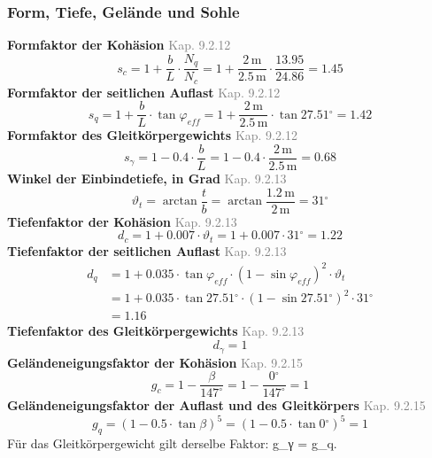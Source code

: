 \documentclass[11pt,a4paper]{article}
\newcommand{\normref}[1]{{\small\textcolor{gray}{#1}}}
\begin{document}
\subsubsection{Form, Tiefe, Gelände und Sohle}
\noindent\textbf{Formfaktor der Kohäsion} \hfill \normref{Kap. 9.2.12}
\begin{equation*}
s_c = 1 + \frac{b}{L} \cdot \frac{N_q}{N_c} = 1 + \frac{2\,\mathrm{m}}{2.5\,\mathrm{m}} \cdot \frac{13.95}{24.86} = 1.45
\end{equation*}
\noindent\textbf{Formfaktor der seitlichen Auflast} \hfill \normref{Kap. 9.2.12}
\begin{equation*}
s_q = 1 + \frac{b}{L} \cdot \tan \varphi_{eff} = 1 + \frac{2\,\mathrm{m}}{2.5\,\mathrm{m}} \cdot \tan 27.51{}^{\circ} = 1.42
\end{equation*}
\noindent\textbf{Formfaktor des Gleitkörpergewichts} \hfill \normref{Kap. 9.2.12}
\begin{equation*}
s_{\gamma} = 1 - 0.4 \cdot \frac{b}{L} = 1 - 0.4 \cdot \frac{2\,\mathrm{m}}{2.5\,\mathrm{m}} = 0.68
\end{equation*}
\noindent\textbf{Winkel der Einbindetiefe, in Grad} \hfill \normref{Kap. 9.2.13}
\begin{equation*}
\vartheta_t = \arctan\frac{t}{b} = \arctan\frac{1.2\,\mathrm{m}}{2\,\mathrm{m}} = 31{}^{\circ}
\end{equation*}
\noindent\textbf{Tiefenfaktor der Kohäsion} \hfill \normref{Kap. 9.2.13}
\begin{equation*}
d_c = 1 + 0.007 \cdot \vartheta_t = 1 + 0.007 \cdot 31{}^{\circ} = 1.22
\end{equation*}
\noindent\textbf{Tiefenfaktor der seitlichen Auflast} \hfill \normref{Kap. 9.2.13}
\begin{equation*}
\begin{aligned}
  d_q &= 1 + 0.035 \cdot \tan \varphi_{eff} \cdot \left(1 - \sin \varphi_{eff}\right)^{2} \cdot \vartheta_t \\
  &= 1 + 0.035 \cdot \tan 27.51{}^{\circ} \cdot \left(1 - \sin 27.51{}^{\circ}\right)^{2} \cdot 31{}^{\circ} \\
  &= 1.16
\end{aligned}
\end{equation*}
\noindent\textbf{Tiefenfaktor des Gleitkörpergewichts} \hfill \normref{Kap. 9.2.13}
\begin{equation*}
d_{\gamma} = 1
\end{equation*}
\noindent\textbf{Geländeneigungsfaktor der Kohäsion} \hfill \normref{Kap. 9.2.15}
\begin{equation*}
g_c = 1 - \frac{\beta}{147^\circ} = 1 - \frac{0{}^{\circ}}{147^\circ} = 1
\end{equation*}
\noindent\textbf{Geländeneigungsfaktor der Auflast und des Gleitkörpers} \hfill \normref{Kap. 9.2.15}
\begin{equation*}
g_q = \left(1 - 0.5 \cdot \tan \beta\right)^{5} = \left(1 - 0.5 \cdot \tan 0{}^{\circ}\right)^{5} = 1
\end{equation*}
Für das Gleitkörpergewicht gilt derselbe Faktor: g\_γ = g\_q.
\end{document}
